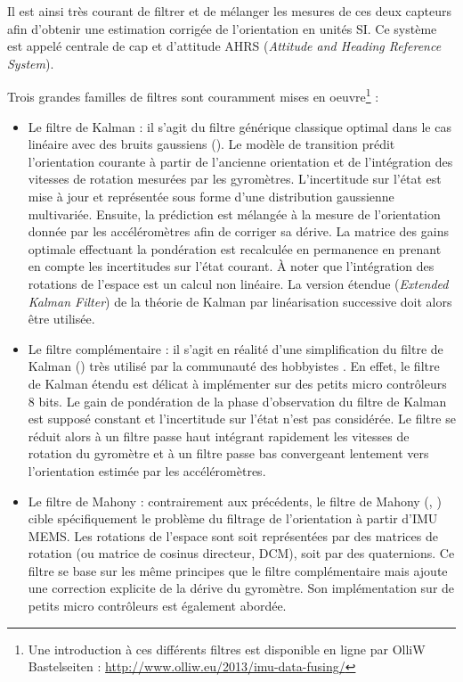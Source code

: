 Il est ainsi très courant de filtrer et de mélanger les mesures
de ces deux capteurs afin d'obtenir une estimation corrigée de
l'orientation en unités SI.
Ce système est appelé \og centrale de cap et d'attitude \fg 
AHRS (\textit{Attitude and Heading Reference System}).

Trois grandes familles de filtres sont couramment mises en 
oeuvre\footnote{Une introduction à ces différents filtres
est disponible en ligne par OlliW Bastelseiten : \url{http://www.olliw.eu/2013/imu-data-fusing/}} :
\begin{itemize}
    \item Le filtre de Kalman : il s'agit du filtre générique classique optimal
        dans le cas linéaire avec des bruits gaussiens (\cite{grewal2011kalman}). 
        Le modèle de transition prédit l'orientation courante à partir de 
        l'ancienne orientation et de l'intégration des vitesses de rotation
        mesurées par les gyromètres. 
        L'incertitude sur l'état est mise à jour et représentée sous forme 
        d'une distribution gaussienne multivariée.
        Ensuite, la prédiction est mélangée à la mesure de l'orientation
        donnée par les accéléromètres afin de corriger sa dérive.
        La matrice des gains optimale effectuant la pondération est recalculée
        en permanence en prenant en compte les incertitudes sur l'état courant.
        À noter que l'intégration des rotations de l'espace est 
        un calcul non linéaire. 
        La version étendue (\textit{Extended Kalman Filter}) 
        de la théorie de Kalman par linéarisation successive 
        doit alors être utilisée.
    \item Le filtre complémentaire : il s'agit en réalité d'une simplification
        du filtre de Kalman (\cite{higgins1975comparison}) 
        très utilisé par la communauté des \og hobbyistes \fg.
        En effet, le filtre de Kalman étendu est délicat à implémenter
        sur des petits micro contrôleurs 8 bits.
        Le gain de pondération de la phase d'observation du filtre de Kalman
        est supposé constant et l'incertitude sur l'état n'est pas considérée.
        Le filtre se réduit alors à un filtre passe haut intégrant rapidement 
        les vitesses de rotation du gyromètre et à un filtre passe bas convergeant 
        lentement vers l'orientation estimée par les accéléromètres.
    \item Le filtre de Mahony : contrairement aux précédents, le filtre de Mahony
        (\cite{mahony_nonlinear_2008}, \cite{euston_complementary_2008}) cible
        spécifiquement le problème du filtrage de l'orientation à partir d'IMU MEMS.
        Les rotations de l'espace sont soit représentées par des matrices de rotation
        (ou matrice de cosinus directeur, DCM), soit par des quaternions.
        Ce filtre se base sur les même principes que le filtre complémentaire mais
        ajoute une correction explicite de la dérive du gyromètre.
        Son implémentation sur de petits micro contrôleurs est 
        également abordée.
\end{itemize}

